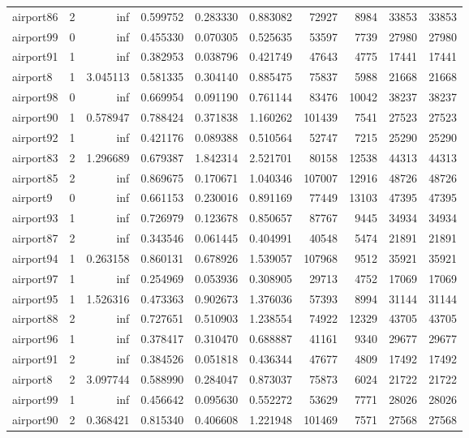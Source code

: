 \begin{longtable}{|l|r|r|r|r|r|r|r|r|r|}
airport86 & 2 & inf & 0.599752 & 0.283330 & 0.883082 & 72927 & 8984 & 33853 & 33853 \\
airport99 & 0 & inf & 0.455330 & 0.070305 & 0.525635 & 53597 & 7739 & 27980 & 27980 \\
airport91 & 1 & inf & 0.382953 & 0.038796 & 0.421749 & 47643 & 4775 & 17441 & 17441 \\
airport8 & 1 & 3.045113 & 0.581335 & 0.304140 & 0.885475 & 75837 & 5988 & 21668 & 21668 \\
airport98 & 0 & inf & 0.669954 & 0.091190 & 0.761144 & 83476 & 10042 & 38237 & 38237 \\
airport90 & 1 & 0.578947 & 0.788424 & 0.371838 & 1.160262 & 101439 & 7541 & 27523 & 27523 \\
airport92 & 1 & inf & 0.421176 & 0.089388 & 0.510564 & 52747 & 7215 & 25290 & 25290 \\
airport83 & 2 & 1.296689 & 0.679387 & 1.842314 & 2.521701 & 80158 & 12538 & 44313 & 44313 \\
airport85 & 2 & inf & 0.869675 & 0.170671 & 1.040346 & 107007 & 12916 & 48726 & 48726 \\
airport9 & 0 & inf & 0.661153 & 0.230016 & 0.891169 & 77449 & 13103 & 47395 & 47395 \\
airport93 & 1 & inf & 0.726979 & 0.123678 & 0.850657 & 87767 & 9445 & 34934 & 34934 \\
airport87 & 2 & inf & 0.343546 & 0.061445 & 0.404991 & 40548 & 5474 & 21891 & 21891 \\
airport94 & 1 & 0.263158 & 0.860131 & 0.678926 & 1.539057 & 107968 & 9512 & 35921 & 35921 \\
airport97 & 1 & inf & 0.254969 & 0.053936 & 0.308905 & 29713 & 4752 & 17069 & 17069 \\
airport95 & 1 & 1.526316 & 0.473363 & 0.902673 & 1.376036 & 57393 & 8994 & 31144 & 31144 \\
airport88 & 2 & inf & 0.727651 & 0.510903 & 1.238554 & 74922 & 12329 & 43705 & 43705 \\
airport96 & 1 & inf & 0.378417 & 0.310470 & 0.688887 & 41161 & 9340 & 29677 & 29677 \\
airport91 & 2 & inf & 0.384526 & 0.051818 & 0.436344 & 47677 & 4809 & 17492 & 17492 \\
airport8 & 2 & 3.097744 & 0.588990 & 0.284047 & 0.873037 & 75873 & 6024 & 21722 & 21722 \\
airport99 & 1 & inf & 0.456642 & 0.095630 & 0.552272 & 53629 & 7771 & 28026 & 28026 \\
airport90 & 2 & 0.368421 & 0.815340 & 0.406608 & 1.221948 & 101469 & 7571 & 27568 & 27568 \\

\end{longtable}
